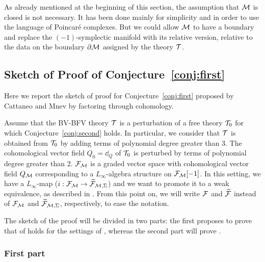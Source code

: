 As already mentioned at the beginning of this section, the assumption that $\mathcal{M}$ is closed is not necessary.
It has been done mainly for simplicity and in order to use the language of Poincaré complexes.
But we could allow $\mathcal{M}$ to have a boundary and replace the $(-1)$-symplectic manifold with its relative version, relative to the data on the boundary $\partial \mathcal{M}$ assigned by the theory $\mathcal{T}$.

\subsection{Sketch of Proof of Conjecture~\ref{conj:first}}
\label{subsec:sketch_proof}

Here we report the sketch of proof for Conjecture~\ref{conj:first} proposed by Cattaneo and Mnev by factoring through cohomology.

Assume that the BV-BFV theory $\mathcal{T}$ is a perturbation of a free theory $\mathcal{T}_0$ for which Conjecture~\ref{conj:second} holds.
In particular, we consider that $\mathcal{T}$ is obtained from $\mathcal{T}_0$ by adding terms of polynomial degree greater than 3.
The cohomological vector field $Q_0 = \dd_Q$ of $\mathcal{T}_0$ is perturbed by terms of polynomial degree greater than 2.
$\mathcal{F}_{\mathcal{M}}$ is a graded vector space with cohomological vector field $Q_{\mathcal{M}}$ corresponding to a $L_\infty$-algebra structure on $\mathcal{F}_{\mathcal{M}}[-1]$.
In this setting, we have a $L_\infty$-map ($i:\mathcal{F}_{\mathcal{M}} \rightarrow \widetilde{\mathcal{F}}_{\mathcal{M}, \Sigma}$) and we want to promote it to a weak equivalence, as described in .
From this point on, we will write $\mathcal{F}$ and $\widetilde{\mathcal{F}}$ instead of $\mathcal{F}_{\mathcal{M}}$ and $\widetilde{\mathcal{F}}_{\mathcal{M}, \Sigma}$, respectively, to ease the notation.

The sketch of the proof will be divided in two parts: the first proposes to prove that  of  holds for the settings of , whereas the second part will prove .

\subsubsection{First part}
\label{subsubsec:first_part}

